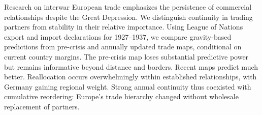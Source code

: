 Research on interwar European trade emphasizes the persistence of commercial relationships despite the Great Depression. We distinguish continuity in trading partners from stability in their relative importance. Using League of Nations export and import declarations for 1927--1937, we compare gravity-based predictions from pre-crisis and annually updated trade maps, conditional on current country margins. The pre-crisis map loses substantial predictive power but remains informative beyond distance and borders. Recent maps predict much better. Reallocation occurs overwhelmingly within established relationships, with Germany gaining regional weight. Strong annual continuity thus coexisted with cumulative reordering: Europe's trade hierarchy changed without wholesale replacement of partners.
